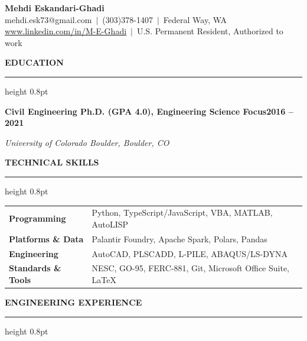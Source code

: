 \documentclass[10pt, letterpaper]{article}
\newcommand{\rsection}[1]{%
  \vspace{8pt}%
  {\large\bfseries\MakeUppercase{#1}}%
  \vspace{1pt}%
  \hrule height 0.8pt%
  \vspace{4pt}%
}
\newcommand{\jobline}[2]{%
  \vspace{5pt}%
  \noindent\textbf{#1}\hfill\textbf{#2}\par%
  \vspace{1pt}%
}
\newcommand{\subline}[1]{%
  \vspace{-1pt}%
  \noindent\textit{#1}\par%
  \vspace{1pt}%
}
\begin{document}
\pagestyle{empty}

\begin{center}
  {\LARGE\bfseries Mehdi Eskandari-Ghadi}\\[4pt]
  mehdi.esk73@gmail.com\ $|$\ (303)378-1407\ $|$\ Federal Way, WA\\[2pt]
  \href{http://www.linkedin.com/in/M-E-Ghadi}{www.linkedin.com/in/M-E-Ghadi}\ $|$\
  U.S. Permanent Resident, Authorized to work
\end{center}

\vspace{2pt}

\rsection{Education}

\jobline{Civil Engineering Ph.D. (GPA 4.0), Engineering Science Focus}{2016 -- 2021}
\subline{University of Colorado Boulder, Boulder, CO}

\rsection{Technical Skills}

\vspace{2pt}
\begin{tabular}{@{}p{4cm}p{13cm}@{}}
  \textbf{Programming}       & Python, TypeScript/JavaScript, VBA, MATLAB, AutoLISP \\[2pt]
  \textbf{Platforms \& Data} & Palantir Foundry, Apache Spark, Polars, Pandas \\[2pt]
  \textbf{Engineering}       & AutoCAD, PLSCADD, L-PILE, ABAQUS/LS-DYNA \\[2pt]
  \textbf{Standards \& Tools} & NESC, GO-95, FERC-881, Git, Microsoft Office Suite, LaTeX \\
\end{tabular}

\rsection{Engineering Experience}
\end{document}
